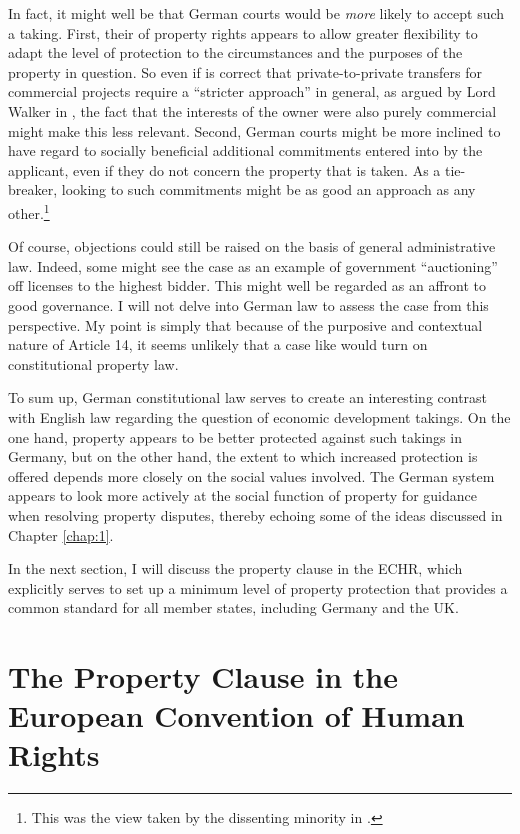 In fact, it might well be that German courts would be {\it more} likely to accept such a taking. First, their  of property rights appears to allow greater flexibility to adapt the level of protection to the circumstances and the purposes of the property in question. So even if is correct that private-to-private transfers for commercial projects require a ``stricter approach'' in general, as argued by Lord Walker in \textcite{sainsbury10}, the fact that the interests of the owner were also purely commercial  might make this less relevant. Second, German courts might be more inclined to have regard to socially beneficial additional commitments entered into by the applicant, even if they do not concern the property that is taken. As a tie-breaker, looking to such commitments might be as good an approach as any other.\footnote{This was the view taken by the dissenting minority in \textcite{sainsbury10}.}

Of course, objections could still be raised on the basis of general administrative law. Indeed, some might see the case as an example of government ``auctioning'' off licenses to the highest bidder. This might well be regarded as an affront to good governance. I will not delve into German law to assess the case from this perspective. My point is simply that because of the purposive and contextual nature of Article 14, it seems unlikely that a case like \textcite{sainsbury10} would turn on constitutional property law.

To sum up, German constitutional law serves to create an interesting contrast with English law regarding the question of economic development takings. On the one hand, property appears to be better protected against such takings in Germany, but on the other hand, the extent to which increased protection is offered depends more closely on the social values involved. The German system appears to look more actively at the social function of property for guidance when resolving property disputes, thereby echoing some of the ideas discussed in Chapter \ref{chap:1}. 

In the next section, I will discuss the property clause in the ECHR, which explicitly serves to set up a minimum level of property protection that provides a common standard for all member states, including Germany and the UK.

\section{The Property Clause in the European Convention of Human Rights}\label{sec:echr}

